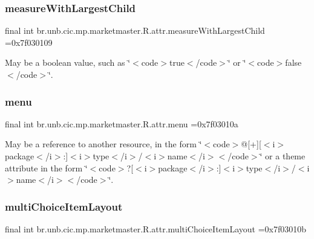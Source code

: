 \subsubsection{\texorpdfstring{measure\+With\+Largest\+Child}{measureWithLargestChild}}
{\footnotesize\ttfamily final int br.\+unb.\+cic.\+mp.\+marketmaster.\+R.\+attr.\+measure\+With\+Largest\+Child =0x7f030109\hspace{0.3cm}{\ttfamily [static]}}

May be a boolean value, such as \char`\"{}$<$code$>$true$<$/code$>$\char`\"{} or \char`\"{}$<$code$>$false$<$/code$>$\char`\"{}. \mbox{\label{classbr_1_1unb_1_1cic_1_1mp_1_1marketmaster_1_1R_1_1attr_a39f238492ccf7c1652903965350889cd}} 
\subsubsection{\texorpdfstring{menu}{menu}}
{\footnotesize\ttfamily final int br.\+unb.\+cic.\+mp.\+marketmaster.\+R.\+attr.\+menu =0x7f03010a\hspace{0.3cm}{\ttfamily [static]}}

May be a reference to another resource, in the form \char`\"{}$<$code$>$@\mbox{[}+\mbox{]}\mbox{[}$<$i$>$package$<$/i$>$\+:\mbox{]}$<$i$>$type$<$/i$>$/$<$i$>$name$<$/i$>$$<$/code$>$\char`\"{} or a theme attribute in the form \char`\"{}$<$code$>$?\mbox{[}$<$i$>$package$<$/i$>$\+:\mbox{]}$<$i$>$type$<$/i$>$/$<$i$>$name$<$/i$>$$<$/code$>$\char`\"{}. \mbox{\label{classbr_1_1unb_1_1cic_1_1mp_1_1marketmaster_1_1R_1_1attr_ad7bdd11b927c020988b8ffe61121e1f3}} 
\subsubsection{\texorpdfstring{multi\+Choice\+Item\+Layout}{multiChoiceItemLayout}}
{\footnotesize\ttfamily final int br.\+unb.\+cic.\+mp.\+marketmaster.\+R.\+attr.\+multi\+Choice\+Item\+Layout =0x7f03010b\hspace{0.3cm}{\ttfamily [static]}}

